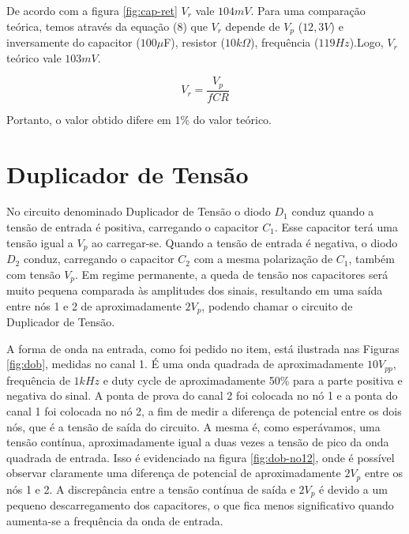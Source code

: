 \documentclass[a4paper]{article} %
\renewcommand{\thefigure}{\thesection.\arabic{figure}}
\begin{document}
\newpage

De acordo com a figura \ref{fig:cap-ret} $V_r$ vale $104mV$. Para uma comparação teórica, temos através da equação (8) que $V_r$ depende de $V_p$ ($12,3V$) e inversamente do capacitor ($100\mu$F), resistor ($10k\Omega$), frequência ($119Hz$).Logo, $V_r$ teórico vale $103mV$.  

\begin{equation}
V_r = \frac{V_p} {fCR}
\end{equation}

Portanto, o valor obtido difere em 1\% do valor teórico.

\renewcommand{\thefigure}{\thesection.\arabic{figure}}

\section{Duplicador de Tensão}

No circuito denominado Duplicador de Tensão o diodo $D_1$ conduz quando a tensão de entrada é positiva, carregando o capacitor $C_1$. Esse capacitor terá uma tensão igual a $V_p$ ao carregar-se. Quando a tensão de entrada é negativa, o diodo $D_2$ conduz, carregando o capacitor $C_2$ com a mesma polarização de $C_1$, também com tensão $V_p$. Em regime permanente, a queda de tensão nos capacitores será muito pequena comparada às amplitudes dos sinais, resultando em uma saída entre nós 1 e 2 de aproximadamente $2V_p$, podendo chamar o circuito de Duplicador de Tensão.

A forma de onda na entrada, como foi pedido no item, está ilustrada nas Figuras \ref{fig:dob}, medidas no canal 1.
É uma onda quadrada de aproximadamente $10 V_{pp}$, frequência de $1kHz$ e duty cycle de aproximadamente
50\% para a parte positiva e negativa do sinal. A ponta de prova do canal 2 foi colocada no nó 1 e a ponta do canal 1 foi colocada no nó 2, a fim de medir
a diferença de potencial entre os dois nós, que é a tensão de saída do circuito. A
mesma é, como esperávamos, uma tensão contínua, aproximadamente igual a
duas vezes a tensão de pico da onda quadrada de entrada.
Isso é evidenciado na figura \ref{fig:dob-no12}, onde é possível observar claramente uma diferença de potencial de aproximadamente $2V_p$ entre os nós 1 e 2. A discrepância entre a tensão contínua de saída e $2V_p$ é devido a um pequeno descarregamento dos capacitores, o que fica menos significativo quando aumenta-se a frequência da onda de entrada.
\end{document}

